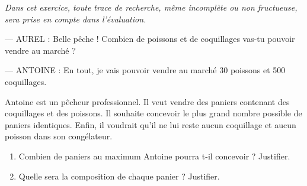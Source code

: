 
\medskip

\emph{Dans cet exercice, toute trace de recherche, même incomplète ou non fructueuse, sera prise en compte dans l'évaluation.}

\medskip

--- AUREL : Belle pêche ! Combien de poissons et de coquillages vas-tu pouvoir vendre au marché ?

--- ANTOINE : En tout, je vais pouvoir vendre au marché 30 poissons et 500 coquillages.

\medskip

Antoine est un pêcheur professionnel. Il veut vendre des paniers contenant des coquillages et des
poissons. Il souhaite concevoir le plus grand nombre possible de paniers identiques. Enfin, il voudrait qu'il ne lui reste aucun coquillage et aucun poisson dans son congélateur.

\medskip

\begin{enumerate}
\item Combien de paniers au maximum Antoine pourra t-il concevoir ? Justifier.
\item Quelle sera la composition de chaque panier ? Justifier.
\end{enumerate}

\vspace{0,5cm}

